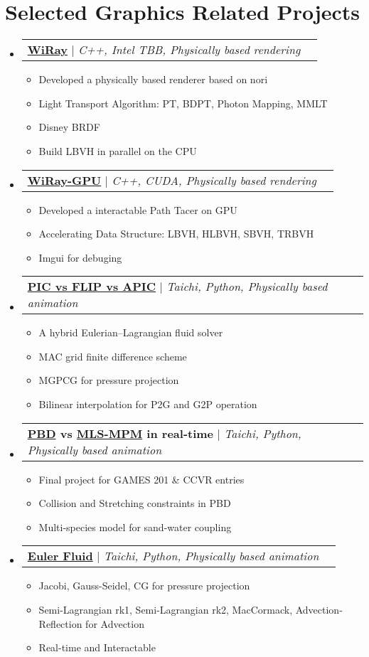 \documentclass[letterpaper,11pt]{article}
\makeatletter
\newcommand{\resumeItem}[1]{
  \item\small{
    {#1 \vspace{-2pt}}
  }
}
\newcommand{\resumeProjectHeading}[2]{
    \item
    \begin{tabular*}{0.97\textwidth}{l@{\extracolsep{\fill}}r}
      \small#1 & #2 \\
    \end{tabular*}\vspace{-7pt}
}
\newcommand{\resumeSubHeadingListStart}{\begin{itemize}[leftmargin=0.15in, label={}]}
\newcommand{\resumeSubHeadingListEnd}{\end{itemize}}
\newcommand{\resumeItemListStart}{\begin{itemize}}
\newcommand{\resumeItemListEnd}{\end{itemize}\vspace{-5pt}}
\makeatother
\begin{document}
\section{Selected Graphics Related Projects}
    \resumeSubHeadingListStart
      \resumeProjectHeading
          {\href{https://github.com/Wimacs/WiRay}{\textbf{WiRay}} $|$ \emph{C++, Intel TBB, Physically based rendering}}{}
          \resumeItemListStart
            \resumeItem{Developed a physically based renderer based on nori}
            \resumeItem{Light Transport Algorithm: PT, BDPT, Photon Mapping, MMLT}
            \resumeItem{Disney BRDF}
            \resumeItem{Build LBVH in parallel on the CPU}
          \resumeItemListEnd
      \resumeProjectHeading
          {\href{https://github.com/Wimacs/WiRay_GPU}{\textbf{WiRay-GPU}} $|$ \emph{C++, CUDA, Physically based rendering}}{}
          \resumeItemListStart
            \resumeItem{Developed a interactable Path Tacer on GPU}
            \resumeItem{Accelerating Data Structure: LBVH, HLBVH, SBVH, TRBVH}
            \resumeItem{Imgui for debuging}
            \resumeItemListEnd
       \resumeProjectHeading
          {\href{https://github.com/Wimacs/taichi_code/tree/master/apf}{\textbf{PIC vs FLIP vs APIC}} $|$ \emph{Taichi,  Python, Physically based animation}}{}
          \resumeItemListStart
            \resumeItem{A hybrid Eulerian–Lagrangian fluid solver}
            \resumeItem{MAC grid finite difference scheme}
            \resumeItem{MGPCG for pressure projection}
            \resumeItem{Bilinear interpolation for P2G and G2P operation}
           \resumeItemListEnd
        \resumeProjectHeading
          {\textbf{\href{https://github.com/Wimacs/taichi_code/tree/master/hw2}{\textbf{PBD}} vs \href{https://github.com/g1n0st/GAMES201/tree/master/hw2}{\textbf{MLS-MPM}} in real-time} $|$ \emph{Taichi,  Python, Physically based animation}}{}
          \resumeItemListStart
            \resumeItem{Final project for GAMES 201 \& CCVR entries}
            \resumeItem{Collision and Stretching constraints in PBD}
            \resumeItem{ Multi-species model for sand-water coupling}
           \resumeItemListEnd
         \resumeProjectHeading
          {\href{https://github.com/Wimacs/taichi_code/tree/master/hw1}{\textbf{Euler Fluid}} $|$ \emph{Taichi,  Python, Physically based animation}}{}
          \resumeItemListStart
            \resumeItem{Jacobi, Gauss-Seidel, CG for pressure projection}
            \resumeItem{Semi-Lagrangian rk1, Semi-Lagrangian rk2, MacCormack, Advection-Reflection for Advection}
            \resumeItem{ Real-time and Interactable}
           \resumeItemListEnd
    \resumeSubHeadingListEnd
\end{document}
